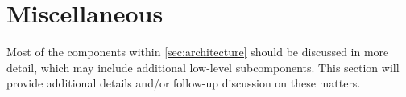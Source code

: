 \documentclass[letterpaper]{article}
\begin{document}

\section{Miscellaneous}
\label{sec:detail}

Most of the components within \cref{sec:architecture} should be
discussed in more detail, which may include additional low-level
subcomponents. This section will provide additional details
and/or follow-up discussion on these matters.









\end{document}
